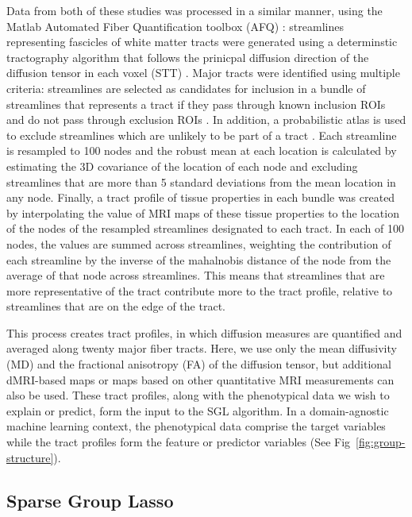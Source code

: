 Data from both of these studies was processed in a similar manner,
using the Matlab Automated Fiber Quantification toolbox (AFQ)
\cite{yeatman2012tract}: streamlines representing fascicles of white
matter tracts were generated using a determinstic tractography algorithm
that follows the prinicpal diffusion direction of the diffusion tensor
in each voxel (STT) \cite{basser2000vivo}. Major tracts were identified
using multiple criteria: streamlines are selected as candidates for
inclusion in a bundle of streamlines that represents a tract if they
pass through known inclusion ROIs and do not pass through exclusion
ROIs \cite{wakana2007reproducibility}. In addition, a probabilistic
atlas is used to exclude streamlines which are unlikely to be part of
a tract \cite{Hua2008-sh}. Each streamline is resampled to 100 nodes
and the robust mean at each location is calculated by estimating the 3D
covariance of the location of each node and excluding streamlines that
are more than 5 standard deviations from the mean location in any node.
Finally, a tract profile of tissue properties in each bundle was created
by interpolating the value of MRI maps of these tissue properties to the
location of the nodes of the resampled streamlines designated to each
tract. In each of 100 nodes, the values are summed across streamlines,
weighting the contribution of each streamline by the inverse of the
mahalnobis distance of the node from the average of that node across
streamlines. This means that streamlines that are more representative of
the tract contribute more to the tract profile, relative to streamlines
that are on the edge of the tract.

This process creates tract profiles, in which diffusion measures
are quantified and averaged along twenty major fiber tracts. Here,
we use only the mean diffusivity (MD) and the fractional anisotropy
(FA) of the diffusion tensor, but additional dMRI-based maps or maps
based on other quantitative MRI measurements can also be used. These
tract profiles, along with the phenotypical data we wish to explain
or predict, form the input to the SGL algorithm. In a domain-agnostic
machine learning context, the phenotypical data comprise the target
variables while the tract profiles form the feature or predictor
variables (See Fig~\ref{fig:group-structure}).

\subsection*{Sparse Group Lasso}

